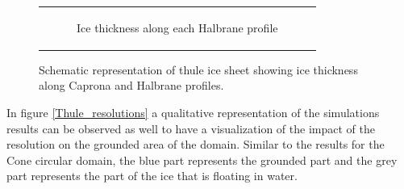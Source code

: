 \documentclass{article}
\begin{document}
\begin{figure}[!h]
\begin{tabular}[c]{@{}c@{}}
\begin{subfigure}[c]{.48\linewidth}
      \caption
        {%
          Ice thickness along each Halbrane profile%
          \label{Halbranes_thule}%
        }%
    \end{subfigure}
  \end{tabular}
  \caption
    {%
      Schematic representation of thule ice sheet showing ice thickness along Caprona and Halbrane profiles.%
      \label{Thule_profiles_capronas_and_halbranes}%
    }
\end{figure}

In figure \ref{Thule_resolutions} a qualitative representation of the simulations results can be observed as well to have a visualization of the impact of the resolution on the grounded area of the domain. Similar to the results for the Cone circular domain, the blue part represents the grounded part and the grey part represents the part of the ice that is floating in water. 
\end{document}
